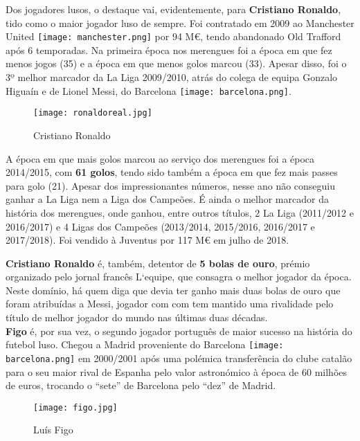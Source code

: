 \documentclass{report}
\begin{document}
Dos jogadores lusos, o destaque vai, evidentemente, para \textbf{Cristiano Ronaldo}, tido como o maior jogador luso de sempre. Foi contratado em 2009 ao Manchester United \texttt{[image: manchester.png]} por 94 M€, tendo abandonado Old Trafford após 6 temporadas. Na primeira época nos merengues foi a época em que fez menos jogos (35) e a época em que menos golos marcou (33). Apesar disso, foi o 3º melhor marcador da La Liga 2009/2010, atrás do colega de equipa Gonzalo Higuaín e de Lionel Messi, do Barcelona \texttt{[image: barcelona.png]}. 

\begin{figure}[h]
    \centering
    \texttt{[image: ronaldoreal.jpg]}
    \caption{Cristiano Ronaldo}
    \label{fig:ronaldoreal}
\end{figure}

A época em que mais golos marcou ao serviço dos merengues foi a época 2014/2015, com \textbf{61 golos}, tendo sido também a época em que fez mais passes para golo (21). Apesar dos impressionantes números, nesse ano não conseguiu ganhar a La Liga nem a Liga dos Campeões. É ainda o melhor marcador da história dos merengues, onde ganhou, entre outros títulos, 2 La Liga (2011/2012 e 2016/2017) e 4 Ligas dos Campeões (2013/2014, 2015/2016, 2016/2017 e 2017/2018). Foi vendido à Juventus por 117 M€ em julho de 2018.

\textbf{Cristiano Ronaldo} é, também, detentor de \textbf{5 bolas de ouro}, prémio organizado pelo jornal francês L`equipe, que consagra o melhor jogador da época. Neste domínio, há quem diga que devia ter ganho mais duas bolas de ouro que foram atribuídas a Messi, jogador com com tem mantido uma rivalidade pelo título de melhor jogador do mundo nas últimas duas décadas.
\\

\textbf{Figo} é, por sua vez, o segundo jogador português de maior sucesso na história do futebol luso. Chegou a Madrid proveniente do Barcelona \texttt{[image: barcelona.png]} em 2000/2001 após uma polémica transferência do clube catalão para o seu maior rival de Espanha pelo valor astronómico à época de 60 milhões de euros, trocando o “sete” de Barcelona pelo “dez” de Madrid.
\\
\begin{figure}[h]
    \centering
    \texttt{[image: figo.jpg]}
    \caption{Luís Figo}
    \label{fig:figo1}
\end{figure}
\end{document}
